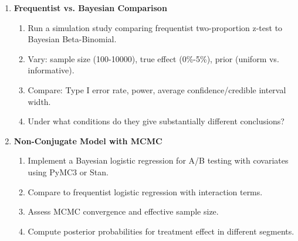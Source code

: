 \begin{enumerate}
    \item \textbf{Frequentist vs. Bayesian Comparison}
    \begin{enumerate}
        \item Run a simulation study comparing frequentist two-proportion z-test to Bayesian Beta-Binomial.
        \item Vary: sample size (100-10000), true effect (0\%-5\%), prior (uniform vs. informative).
        \item Compare: Type I error rate, power, average confidence/credible interval width.
        \item Under what conditions do they give substantially different conclusions?
    \end{enumerate}

    \item \textbf{Non-Conjugate Model with MCMC}
    \begin{enumerate}
        \item Implement a Bayesian logistic regression for A/B testing with covariates using PyMC3 or Stan.
        \item Compare to frequentist logistic regression with interaction terms.
        \item Assess MCMC convergence and effective sample size.
        \item Compute posterior probabilities for treatment effect in different segments.
    \end{enumerate}
\end{enumerate}
